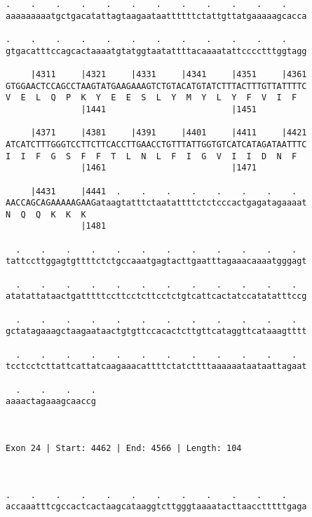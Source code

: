 \documentclass{article}
\begin{document}
\begin{Verbatim}
.    .    .    .    .    .    .    .    .    .    .    .    
aaaaaaaaatgctgacatattagtaagaataattttttctattgttatgaaaaagcacca
                                                            
.    .    .    .    .    .    .    .    .    .    .    .    
gtgacatttccagcactaaaatgtatggtaatattttacaaaatattcccctttggtagg
                                                            
     |4311     |4321     |4331     |4341     |4351     |4361
GTGGAACTCCAGCCTAAGTATGAAGAAAGTCTGTACATGTATCTTTACTTTGTTATTTTC
V  E  L  Q  P  K  Y  E  E  S  L  Y  M  Y  L  Y  F  V  I  F  
               |1441                         |1451          
  
     |4371     |4381     |4391     |4401     |4411     |4421
ATCATCTTTGGGTCCTTCTTCACCTTGAACCTGTTTATTGGTGTCATCATAGATAATTTC
I  I  F  G  S  F  F  T  L  N  L  F  I  G  V  I  I  D  N  F  
               |1461                         |1471          
  
     |4431     |4441  .    .    .    .    .    .    .    .  
AACCAGCAGAAAAAGAAGataagtatttctaatattttctctcccactgagatagaaaat
N  Q  Q  K  K  K                                            
               |1481                                        
  
  .    .    .    .    .    .    .    .    .    .    .    .  
tattccttggagtgttttctctgccaaatgagtacttgaatttagaaacaaaatgggagt
                                                            
  .    .    .    .    .    .    .    .    .    .    .    .  
atatattataactgatttttccttcctcttcctctgtcattcactatccatatatttccg
                                                            
  .    .    .    .    .    .    .    .    .    .    .    .  
gctatagaaagctaagaataactgtgttccacactcttgttcataggttcataaagtttt
                                                            
  .    .    .    .    .    .    .    .    .    .    .    .  
tcctcctcttattcattatcaagaaacattttctatcttttaaaaaataataattagaat
                                                            
  .    .    .    .
aaaactagaaagcaaccg
                  
                  
 
Exon 24 | Start: 4462 | End: 4566 | Length: 104



.    .    .    .    .    .    .    .    .    .    .    .    
accaaatttcgccactcactaagcataaggtcttgggtaaaatacttaacctttttgaga
                                                            

\end{Verbatim}
\end{document}
